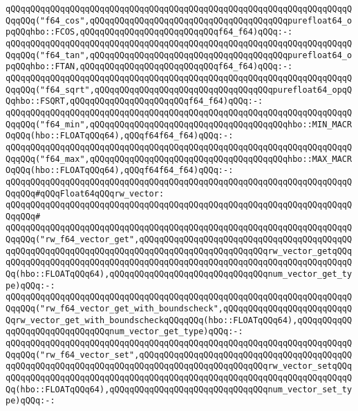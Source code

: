 \verb|qQQqqQQqqQQqqQQqqQQqqQQqqQQqqQQqqQQqqQQqqQQqqQQqqQQqqQQqqQQqqQQqqQQqqQQqqQQq("f64_cos",qQQqqQQqqQQqqQQqqQQqqQQqqQQqqQQqqQQqqQQqpurefloat64_opqQQqhbo::FCOS,qQQqqQQqqQQqqQQqqQQqqQQqqQQqf64_f64)qQQq:-:|\newline
\verb|qQQqqQQqqQQqqQQqqQQqqQQqqQQqqQQqqQQqqQQqqQQqqQQqqQQqqQQqqQQqqQQqqQQqqQQqqQQq("f64_tan",qQQqqQQqqQQqqQQqqQQqqQQqqQQqqQQqqQQqqQQqpurefloat64_opqQQqhbo::FTAN,qQQqqQQqqQQqqQQqqQQqqQQqqQQqf64_f64)qQQq:-:|\newline
\verb|qQQqqQQqqQQqqQQqqQQqqQQqqQQqqQQqqQQqqQQqqQQqqQQqqQQqqQQqqQQqqQQqqQQqqQQqqQQq("f64_sqrt",qQQqqQQqqQQqqQQqqQQqqQQqqQQqqQQqqQQqpurefloat64_opqQQqhbo::FSQRT,qQQqqQQqqQQqqQQqqQQqqQQqf64_f64)qQQq:-:|\newline
\newline
\verb|qQQqqQQqqQQqqQQqqQQqqQQqqQQqqQQqqQQqqQQqqQQqqQQqqQQqqQQqqQQqqQQqqQQqqQQqqQQq("f64_min",qQQqqQQqqQQqqQQqqQQqqQQqqQQqqQQqqQQqqQQqhbo::MIN_MACROqQQq(hbo::FLOATqQQq64),qQQqf64f64_f64)qQQq:-:|\newline
\verb|qQQqqQQqqQQqqQQqqQQqqQQqqQQqqQQqqQQqqQQqqQQqqQQqqQQqqQQqqQQqqQQqqQQqqQQqqQQq("f64_max",qQQqqQQqqQQqqQQqqQQqqQQqqQQqqQQqqQQqqQQqhbo::MAX_MACROqQQq(hbo::FLOATqQQq64),qQQqf64f64_f64)qQQq:-:|\newline
\newline
\verb|qQQqqQQqqQQqqQQqqQQqqQQqqQQqqQQqqQQqqQQqqQQqqQQqqQQqqQQqqQQqqQQqqQQqqQQqqQQq#qQQqFloat64qQQqrw_vector:|\newline
\verb|qQQqqQQqqQQqqQQqqQQqqQQqqQQqqQQqqQQqqQQqqQQqqQQqqQQqqQQqqQQqqQQqqQQqqQQqqQQq#|\newline
\verb|qQQqqQQqqQQqqQQqqQQqqQQqqQQqqQQqqQQqqQQqqQQqqQQqqQQqqQQqqQQqqQQqqQQqqQQqqQQq("rw_f64_vector_get",qQQqqQQqqQQqqQQqqQQqqQQqqQQqqQQqqQQqqQQqqQQqqQQqqQQqqQQqqQQqqQQqqQQqqQQqqQQqqQQqqQQqqQQqqQQqqQQqrw_vector_getqQQqqQQqqQQqqQQqqQQqqQQqqQQqqQQqqQQqqQQqqQQqqQQqqQQqqQQqqQQqqQQqqQQqqQQqqQQq(hbo::FLOATqQQq64),qQQqqQQqqQQqqQQqqQQqqQQqqQQqqQQqnum_vector_get_type)qQQq:-:|\newline
\verb|qQQqqQQqqQQqqQQqqQQqqQQqqQQqqQQqqQQqqQQqqQQqqQQqqQQqqQQqqQQqqQQqqQQqqQQqqQQq("rw_f64_vector_get_with_boundscheck",qQQqqQQqqQQqqQQqqQQqqQQqqQQqrw_vector_get_with_boundscheckqQQqqQQq(hbo::FLOATqQQq64),qQQqqQQqqQQqqQQqqQQqqQQqqQQqqQQqnum_vector_get_type)qQQq:-:|\newline
\verb|qQQqqQQqqQQqqQQqqQQqqQQqqQQqqQQqqQQqqQQqqQQqqQQqqQQqqQQqqQQqqQQqqQQqqQQqqQQq("rw_f64_vector_set",qQQqqQQqqQQqqQQqqQQqqQQqqQQqqQQqqQQqqQQqqQQqqQQqqQQqqQQqqQQqqQQqqQQqqQQqqQQqqQQqqQQqqQQqqQQqqQQqrw_vector_setqQQqqQQqqQQqqQQqqQQqqQQqqQQqqQQqqQQqqQQqqQQqqQQqqQQqqQQqqQQqqQQqqQQqqQQqqQQq(hbo::FLOATqQQq64),qQQqqQQqqQQqqQQqqQQqqQQqqQQqqQQqnum_vector_set_type)qQQq:-:|\newline
